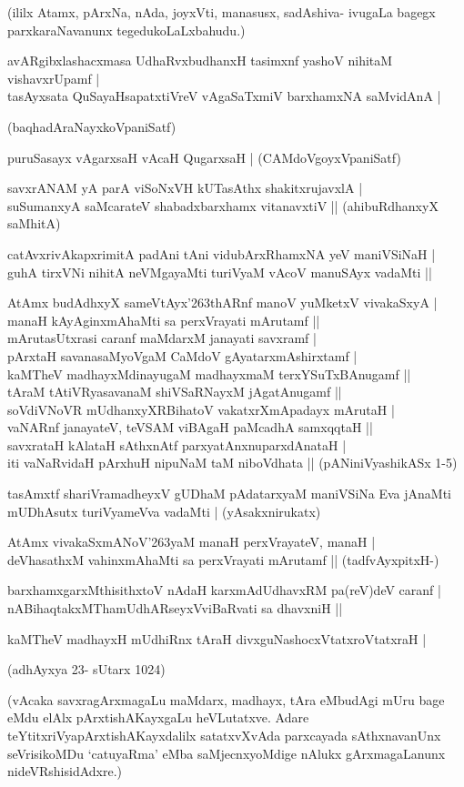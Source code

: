 \noindent
(ililx Atamx, pArxNa, nAda, joyxVti, manasusx, sadAshiva- ivugaLa bagegx parxkaraNavanunx tegedukoLaLx\-bahudu.)
\begin{itemize}
{\bf 
\item[58.] avARgibxlashacxmasa UdhaRvxbudhanxH tasimxnf yashoV nihitaM vishavxrUpamf |\\\label{152}
tasAyxsata QuSayaHsapatxtiVreV vAgaSaTxmiV barxhamxNA saMvidAnA |

\hfill{(baqhadAraNayxkoVpaniSatf)}
\item[59.] puruSasayx vAgarxsaH vAcaH QugarxsaH |\label{152}
\hfill{(CAMdoVgoyxVpaniSatf)}
\item[60.] savxrANAM yA parA viSoNxVH kUTasAthx shakitxrujavxlA |\\\label{152}
suSumanxyA saMcarateV shabadxbarxhamx vitanavxtiV ||
\hfill{(ahibuRdhanxyX saMhitA)}
\item[61.] catAvxrivAkapxrimitA padAni tAni vidubArxRhamxNA yeV maniVSiNaH |\\\label{152}
guhA tirxVNi nihitA neVMgayaMti turiVyaM vAcoV manuSAyx vadaMti ||
\item[62.] AtAmx budAdhxyX sameVtAyx\char'263thARnf manoV yuMketxV vivakaSxyA |\\\label{152}
manaH kAyAginxmAhaMti sa perxVrayati mArutamf ||\\
mArutasUtxrasi caranf maMdarxM janayati savxramf |\\
pArxtaH savanasaMyoVgaM CaMdoV gAyatarxmAshirxtamf |\\
kaMTheV madhayxMdinayugaM madhayxmaM terxYSuTxBAnugamf ||\\
tAraM tAtiVRyasavanaM shiVSaRNayxM jAgatAnugamf ||\\
soVdiVNoVR mUdhanxyXRBihatoV vakatxrXmApadayx mArutaH |\\
vaNARnf janayateV, teVSAM viBAgaH paMcadhA samxqqtaH ||\\
savxrataH kAlataH sAthxnAtf parxyatAnxnuparxdAnataH |\\
iti vaNaRvidaH pArxhuH nipuNaM taM niboVdhata ||
\hfill{(pANiniVyashikASx 1-5)}
\item[63.] tasAmxtf shariVramadheyxV gUDhaM pAdatarxyaM maniVSiNa Eva jAnaMti \\\label{153}
mUDhAsutx turiVyameVva vadaMti |
\hfill{(yAsakxnirukatx)}
\item[64.] AtAmx vivakaSxmANoV\char'263yaM manaH perxVrayateV, manaH |\\\label{153}
deVhasathxM vahinxmAhaMti sa perxVrayati mArutamf ||
\hfill{(tadfvAyxpitxH-)}
\item[65.] barxhamxgarxMthisithxtoV nAdaH karxmAdUdhavxRM pa(reV)deV caranf |\\
nABihaqtakxMThamUdhARseyxVviBaRvati sa dhavxniH ||
\item[66.] kaMTheV madhayxH mUdhiRnx tAraH divxguNashocxVtatxroVtatxraH |\label{153}

\hfill (adhAyxya 23- sUtarx 1024)
}
\end{itemize}
(vAcaka savxragArxmagaLu maMdarx, madhayx, tAra eMbudAgi mUru bage eMdu elAlx pArxtishAKayx\-gaLu heVLutatxve. Adare teYtitxriVyapArxtishAKayxdalilx satatxvXvAda parxcayada sAthxnavanUnx seVrisikoMDu `catu\-yaRma' eMba saMjecnxyoMdige nAlukx gArxmagaLanunx nideVRshisidAdxre.) 

